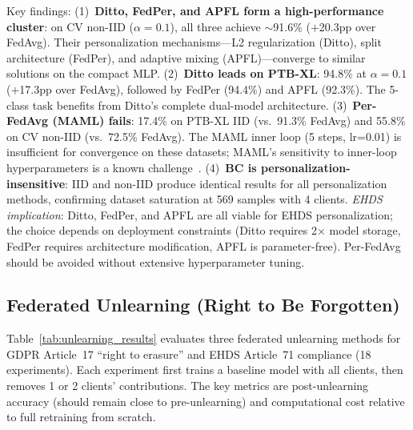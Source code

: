 \documentclass[conference,a4paper]{IEEEtran}
\begin{document}
\begin{table}[htbp]
\vspace{1mm}
\footnotesize{Key findings: (1)~\textbf{Ditto, FedPer, and APFL form a high-performance cluster}: on CV non-IID ($\alpha{=}0.1$), all three achieve $\sim$91.6\% ($+$20.3pp over FedAvg). Their personalization mechanisms---L2 regularization (Ditto), split architecture (FedPer), and adaptive mixing (APFL)---converge to similar solutions on the compact MLP. (2)~\textbf{Ditto leads on PTB-XL}: 94.8\% at $\alpha{=}0.1$ ($+$17.3pp over FedAvg), followed by FedPer (94.4\%) and APFL (92.3\%). The 5-class task benefits from Ditto's complete dual-model architecture. (3)~\textbf{Per-FedAvg (MAML) fails}: 17.4\% on PTB-XL IID (vs.\ 91.3\% FedAvg) and 55.8\% on CV non-IID (vs.\ 72.5\% FedAvg). The MAML inner loop (5 steps, lr=0.01) is insufficient for convergence on these datasets; MAML's sensitivity to inner-loop hyperparameters is a known challenge~\cite{fallah2020personalized}. (4)~\textbf{BC is personalization-insensitive}: IID and non-IID produce identical results for all personalization methods, confirming dataset saturation at 569 samples with 4 clients. \textit{EHDS implication}: Ditto, FedPer, and APFL are all viable for EHDS personalization; the choice depends on deployment constraints (Ditto requires 2$\times$ model storage, FedPer requires architecture modification, APFL is parameter-free). Per-FedAvg should be avoided without extensive hyperparameter tuning.}
\end{table}

\subsection{Federated Unlearning (Right to Be Forgotten)}
\label{sec:unlearning_exp}

Table~\ref{tab:unlearning_results} evaluates three federated unlearning methods for GDPR Article~17 ``right to erasure'' and EHDS Article~71 compliance (18 experiments). Each experiment first trains a baseline model with all clients, then removes 1 or 2 clients' contributions. The key metrics are post-unlearning accuracy (should remain close to pre-unlearning) and computational cost relative to full retraining from scratch.
\end{document}
